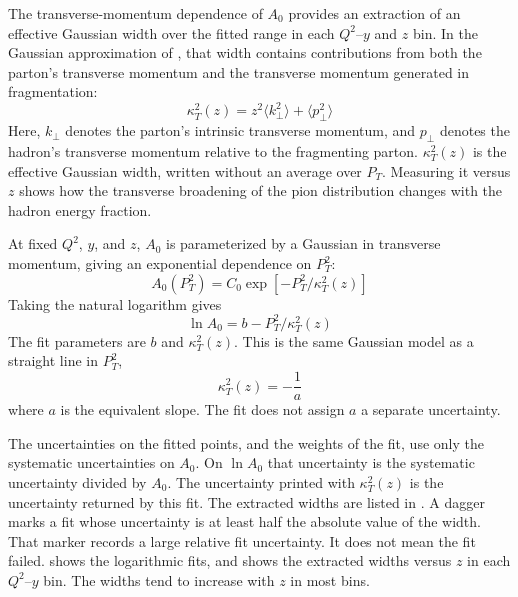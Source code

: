 The transverse-momentum dependence of $A_{0}$ provides an extraction of an effective Gaussian width over the fitted range in each $Q^{2}$--$y$ and $z$ bin. In the Gaussian approximation of \cite{Anselmino:2005nn}, that width contains contributions from both the parton's transverse momentum and the transverse momentum generated in fragmentation:
\begin{equation}
    \kappa_T^{2}(z) = z^{2}\langle k_{\perp}^{2}\rangle + \langle p_{\perp}^{2}\rangle
\end{equation}
Here, $k_{\perp}$ denotes the parton's intrinsic transverse momentum, and $p_{\perp}$ denotes the hadron's transverse momentum relative to the fragmenting parton. $\kappa_T^{2}(z)$ is the effective Gaussian width, written without an average over $P_T$. Measuring it versus $z$ shows how the transverse broadening of the pion distribution changes with the hadron energy fraction.

At fixed $Q^{2}$, $y$, and $z$, $A_{0}$ is parameterized by a Gaussian in transverse momentum, giving an exponential dependence on $P_T^{2}$:
\begin{equation}
    A_{0}(P_T^{2}) = C_{0}\exp\!\left[-P_T^{2}/\kappa_T^{2}(z)\right]
    \label{eq:A0Gaussian}
\end{equation}
Taking the natural logarithm gives
\begin{equation}
    \ln A_{0} = b - P_T^{2}/\kappa_T^{2}(z)
    \label{eq:LnA0Line}
\end{equation}
The fit parameters are $b$ and $\kappa_T^{2}(z)$. This is the same Gaussian model as a straight line in $P_T^{2}$,
\begin{equation}
    \kappa_T^{2}(z)=-\frac{1}{a}
    \label{eq:kT2Definition}
\end{equation}
where $a$ is the equivalent slope. The fit does not assign $a$ a separate uncertainty.

The uncertainties on the fitted points, and the weights of the fit, use only the systematic uncertainties on $A_{0}$. On $\ln A_{0}$ that uncertainty is the systematic uncertainty divided by $A_{0}$. The uncertainty printed with $\kappa_T^{2}(z)$ is the uncertainty returned by this fit. The extracted widths are listed in . A dagger marks a fit whose uncertainty is at least half the absolute value of the width. That marker records a large relative fit uncertainty. It does not mean the fit failed.  shows the logarithmic fits, and  shows the extracted widths versus $z$ in each $Q^{2}$--$y$ bin. The widths tend to increase with $z$ in most bins.

